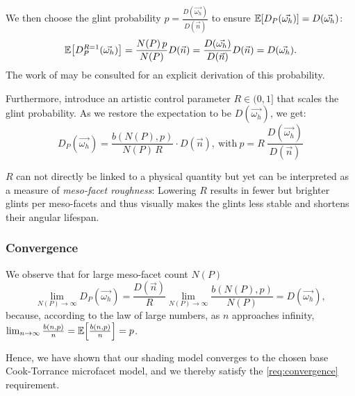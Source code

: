 We then choose the glint probability $p = \frac{D(\vec{\omega_h})}{D(\vec{n})}$ to ensure $\expectation{D_P(\vec{\omega_h})} = D(\vec{\omega_h})$:
%
\begin{equation}
    \expectation{D_P^{R=1}(\vec{\omega_h})}
    = \frac{N(P) \, p}{N(P)} D(\vec{n})
    = \frac{D(\vec{\omega_h})}{D(\vec{n})} D(\vec{n})
    = D(\vec{\omega_h}).
\end{equation}
%
The work of \textcite{zirr2016} may be consulted for an explicit derivation of this probability.

Furthermore, \textcite{deliot2023} introduce an artistic control parameter $R \in (0,1]$ that scales the glint probability.
%
As we restore the expectation to be $D(\vec{\omega_h})$, we get:
%
\begin{equation}
\label{eq:glint-distribution-term}
    D_P(\vec{\omega_h})=\frac{b(N(P), p)}{N(P)\,R} \cdot D(\vec{n}),
    ~\text{with}~
    p = R~\frac{D(\vec{\omega_h})}{D(\vec{n})}
\end{equation}


$R$ can not directly be linked to a physical quantity but yet can be interpreted as a measure of \emph{meso-facet roughness}: Lowering $R$ results in fewer but brighter glints per meso-facets and thus visually makes the glints less stable and shortens their angular lifespan.


\subsubsection{Convergence}
\label{sec:convergence-proof}

We observe that for large meso-facet count $N(P)$
%
\begin{equation}
\label{eq:convergence}
    \lim_{N(P) \to \infty} D_P(\vec{\omega_h})
    = \frac{D(\vec{n})}{R} \lim_{N(P) \to \infty} \frac{b(N(P), p)}{N(P)}
    = D(\vec{\omega_h}),
\end{equation}
%
because, according to the law of large numbers, as $n$ approaches infinity, $\lim_{n \to \infty}\frac{b(n,p)}{n}=\expectation{\frac{b(n,p)}{n}}=p$.


Hence, we have shown that our shading model converges to the chosen base Cook-Torrance microfacet model, and we thereby satisfy the \ref{req:convergence} requirement.